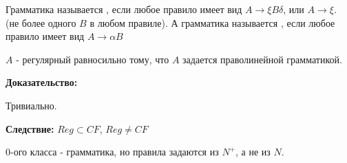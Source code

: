 Грамматика называется , если любое правило имеет вид $A \rightarrow \xi B \delta$, или $A \rightarrow \xi$. (не более одного $B$ в любом правиле). А грамматика называется , если любое правило имеет вид $A \rightarrow \alpha B$ 


$A$ - регулярный равносильно тому, что $A$ задается праволинейной грамматикой.

\textbf{Доказательство:}

Тривиально.

\textbf{Следствие:} $Reg \subset CF$, $Reg \neq CF$



 $0$-ого класса - грамматика, но  правила задаются из $N^+$, а не из $N$.


